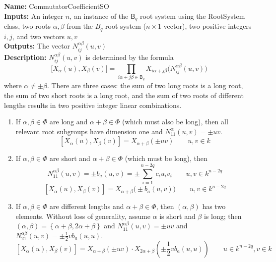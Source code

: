 \documentclass[12pt]{article}
\theoremstyle{definition}
\numberwithin{theorem}{subsection}
\newcommand{\lp}{\left(}
\newcommand{\rp}{\right)}
\newcommand{\lb}{\left\{}
\newcommand{\rb}{\right\}}
\newcommand{\tbf}{\textbf}
\newcommand{\noi}{\noindent}
\begin{document}
\begin{framed}
\noi \tbf{Name:} CommutatorCoefficientSO \\
\noi \tbf{Inputs:} An integer $n$, an instance of the $\mathsf{B}_{q}$ root system using the RootSystem class, two roots $\alpha, \beta$ from the $B_{q}$ root system ($n \times 1$ vector), two positive integers $i,j$,  and two vectors $u, v$ \\
\noi \tbf{Outputs:} The vector $N_{ij}^{\alpha \beta}(u,v)$ \\
\noi \tbf{Description:} $N_{ij}^{\alpha \beta}(u,v)$ is determined by the formula
\[
	\Big[ X_\alpha(u), X_\beta(v) \Big] = \prod_{i \alpha + j \beta \in \mathsf{B}_q} X_{i\alpha + j \beta} \Big( N_{ij}^{\alpha \beta}(u,v) \Big) 
\]
where $\alpha \neq \pm \beta$. There are three cases: the sum of two long roots is a long root, the sum of two short roots is a long root, and the sum of two roots of different lengths results in two positive integer linear combinations.
\begin{enumerate}
	\item If $\alpha, \beta \in \Phi$ are long and $\alpha + \beta \in \Phi$ (which must also be long), then all relevant root subgroups have dimension one and $N_{11}^{\alpha}(u,v) = \pm uv$. 
		\[
		[X_\alpha(u), X_\beta(v)] = X_{\alpha + \beta}(\pm uv) \qquad u, v \in k
	\]
	\item If $\alpha, \beta \in \Phi$ are short and $\alpha + \beta \in \Phi$ (which must be long), then
	\[
		N_{11}^{\alpha \beta}(u,v) = \pm b_a(u,v) = \pm \sum_{i=1}^{n-2q} c_i u_i v_i \qquad u, v \in k^{n-2q}
	\]
	\[
		[X_\alpha(u), X_\beta(v)] = X_{\alpha + \beta}\Big( \pm b_a(u,v) \Big)\qquad u, v \in k^{n-2q}
	\]
	\item If $\alpha, \beta \in \Phi$ are different lengths and $\alpha + \beta \in \Phi$, then $(\alpha, \beta)$ has two elements. Without loss of generality, assume $\alpha$ is short and $\beta$ is long; then $(\alpha , \beta) = \lb \alpha + \beta, 2\alpha+\beta \rb$ and $N_{11}^{\alpha \beta}(u,v) =  \pm uv$ and $N_{21}^{\alpha \beta}(u,v) = \pm \frac 12 v b_a(u,u)$.
	\[
		[X_\alpha(u), X_\beta(v)] = X_{\alpha + \beta}( \pm uv ) \cdot X_{2\alpha+\beta}\lp \pm \frac 12 v b_a(u,u) \rp \qquad u \in k^{n-2q}, v \in k
	\]
\end{enumerate}
\end{framed}
\end{document}
